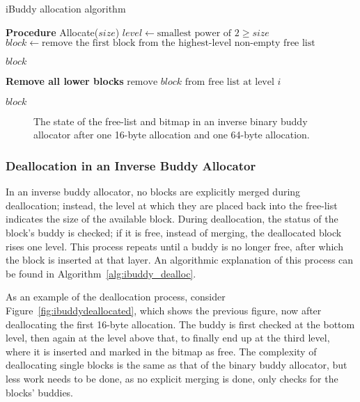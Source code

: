 \begin{algorithm}[h]
  \caption{iBuddy allocation algorithm}
  \label{alg:ibuddy_alloc}
  \begin{algorithmic}[1]
    \Statex \textbf{Procedure} Allocate($size$)
    \State $level \gets \text{smallest power of 2} \geq size$
    \State $block \gets \text{remove the first block from the highest-level non-empty free list}$

    \State \Return $block$
    \State \Return {}
    \EndIf

    \Statex \textbf{Remove all lower blocks}
    \State $\text{remove } block \text{ from free list at level } i$
    \EndFor
    \EndFor

    \State \Return $block$
  \end{algorithmic}
\end{algorithm}

\begin{figure}[h]
  \centering
  
  \caption{The state of the free-list and bitmap in an inverse binary buddy allocator after one
    16-byte allocation and one 64-byte allocation.}
  \label{fig:ibuddyallocated2}
\end{figure}


\subsubsection{Deallocation in an Inverse Buddy Allocator}
In an inverse buddy allocator, no blocks are explicitly merged during deallocation; instead, the level at which they are placed back into the free-list indicates the size of the available block. During deallocation, the status of the block's buddy is checked; if it is free, instead of merging, the deallocated block rises one level. This process repeats until a buddy is no longer free, after which the block is inserted at that layer. An algorithmic explanation of this process can be found in Algorithm~\ref{alg:ibuddy_dealloc}.

As an example of the deallocation process, consider Figure~\ref{fig:ibuddydeallocated}, which shows the previous figure, now after deallocating the first 16-byte allocation. The buddy is first checked at the bottom level, then again at the level above that, to finally end up at the third level, where it is inserted and marked in the bitmap as free. The complexity of deallocating single blocks is the same as that of the binary buddy allocator, but less work needs to be done, as no explicit merging is done, only checks for the blocks' buddies.

